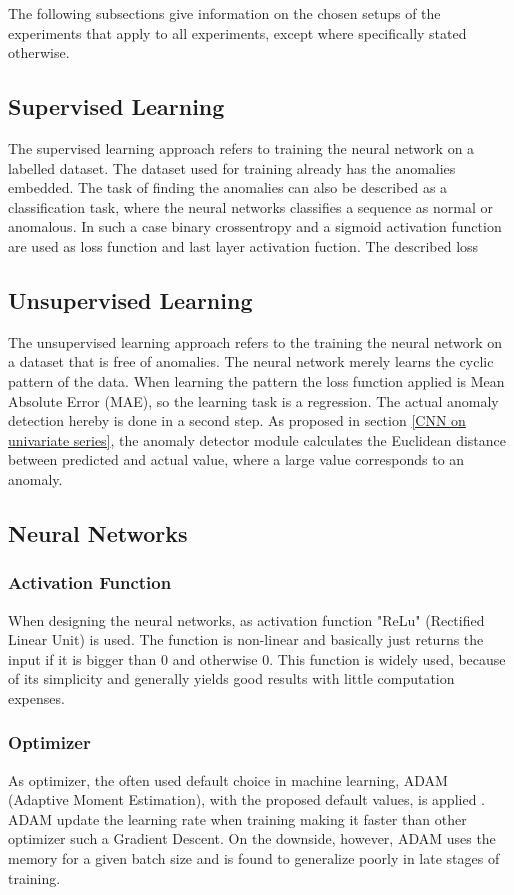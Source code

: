 The following subsections give information on the chosen setups of the experiments that apply to all experiments, except where specifically stated otherwise.

\subsection{Supervised Learning}
The supervised learning approach refers to training the neural network on a labelled dataset. The dataset used for training already has the anomalies embedded. The task of finding the anomalies can also be described as a classification task, where the neural networks classifies a sequence as normal or anomalous. In such a case binary crossentropy and a sigmoid activation function are used as loss function and last layer activation fuction. The described loss 

\subsection{Unsupervised Learning}
The unsupervised learning approach refers to the training the neural network on a dataset that is free of anomalies. The neural network merely learns the cyclic pattern of the data. When learning the pattern the loss function applied is Mean Absolute Error (MAE), so the learning task is a regression. The actual anomaly detection hereby is done in a second step. As proposed in section \ref{CNN on univariate series}, the anomaly detector module calculates the Euclidean distance between predicted and actual value, where a large value corresponds to an anomaly.

\subsection{Neural Networks}

\subsubsection{Activation Function}
When designing the neural networks, as activation function "ReLu" (Rectified Linear Unit) is used. The function is non-linear and basically just returns the input if it is bigger than 0 and otherwise 0. This function is widely used, because of its simplicity and generally yields good results with little computation expenses.  

\subsubsection{Optimizer}
As optimizer, the often used default choice in machine learning, ADAM (Adaptive Moment Estimation), with the proposed default values, is applied \parencite{AUTHOR,YEAR}. ADAM update the learning rate when training making it faster than other optimizer such a Gradient Descent. On the downside, however, ADAM uses the memory for a given batch size and is found to generalize poorly in late stages of training.

